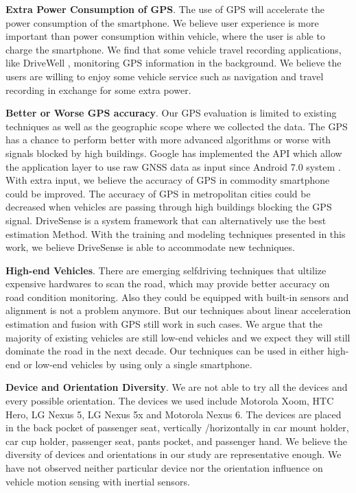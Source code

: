 
\textbf{Extra Power Consumption of GPS}. 
The use of GPS will accelerate the power consumption of the smartphone. 
We believe user experience is more important
than power consumption within vehicle, 
where the user is able to charge the smartphone. 
We find that some vehicle travel recording applications, like DriveWell \cite{cmt} , monitoring GPS information
in the background. 
We believe the users are willing to enjoy some 
vehicle service such as navigation and travel recording
in exchange for some extra power.  



\textbf{Better or Worse GPS accuracy}. 
Our GPS evaluation is limited to existing techniques as well as the
geographic scope where we collected the data. 
The GPS has a chance to perform better with more advanced algorithms
or worse with signals blocked by high buildings. 
Google has implemented the API which allow the application layer to use raw GNSS data as input
since Android 7.0 system \cite{android_gnss, google_gnss_tools}.
With extra input, we believe the accuracy of GPS in commodity 
smartphone could be improved. 
The accuracy of GPS in metropolitan cities could be decreased when vehicles are passing through high buildings blocking the GPS signal.
DriveSense is a system framework that can alternatively use the best estimation
Method.
With the training and modeling techniques presented in this work, 
we believe DriveSense is able to accommodate new techniques.  

\textbf{High-end Vehicles}. 
There are emerging selfdriving techniques that ultilize 
expensive hardwares to scan the road, 
which may provide better accuracy on road condition
monitoring. 
Also they could be equipped with built-in sensors
and alignment is not a problem anymore. 
But our techniques about linear acceleration
estimation and fusion with GPS still work
in such cases. 
We argue that the majority of existing
vehicles are still low-end vehicles 
and we expect they will still dominate 
the road in the next decade. 
Our techniques can be used in either high-end 
or low-end vehicles by using only
a single smartphone. 


\textbf{Device and Orientation Diversity}. 
We are not able to try all the devices and 
every possible orientation. 
The devices we used include Motorola Xoom,
HTC Hero, LG Nexus 5, LG Nexus 5x and Motorola Nexus 6. 
The devices are placed in the back pocket of passenger
seat, vertically /horizontally in car mount holder, 
car cup holder, passenger seat, pants pocket, 
and passenger hand.  
We believe the diversity of devices and orientations in our study are representative enough. 
We have not observed neither particular device nor 
the orientation influence on vehicle motion sensing
with inertial sensors. 



